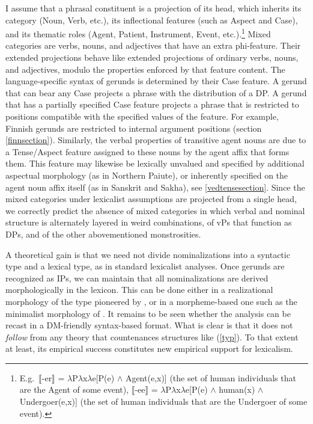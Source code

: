 \documentclass[output=paper,
modfonts
]{LSP/langsci}
\newcommand{\rf}[1]{(\ref{#1})}
\begin{document}
I assume that a phrasal constituent is a projection of its head, which inherits its category
(Noun, Verb, etc.), its inflectional features (such as Aspect and Case), and its thematic roles
(Agent, Patient, Instrument, Event, etc.).\footnote{E.g.\ ⟦-er⟧ =
  {$\lambda$}P{$\lambda$}x{$\lambda$}e[P(e) $\wedge$ Agent(e,x)] (the set of human individuals
  that are the Agent of some event), ⟦-ee⟧ = {$\lambda$}P{$\lambda$}x{$\lambda$}e[P(e) $\wedge$
  human(x) $\wedge$ Undergoer(e,x)] (the set of human individuals that are the Undergoer of
  some event).}  Mixed categories are verbs, nouns, and adjectives that have an extra
phi-feature.  Their extended projections behave like extended projections of ordinary verbs,
nouns, and adjectives, modulo the properties enforced by that feature content.  The
language-specific syntax of gerunds is determined by their Case feature. A gerund that can bear
any Case projects a phrase with the distribution of a DP.  A gerund that has a partially
specified Case feature projects a phrase that is restricted to positions compatible with the
specified values of the feature.  For example, Finnish gerunds are restricted to internal
argument positions (section \ref{finnsection}).  Similarly, the verbal properties of transitive
agent nouns are due to a Tense/Aspect feature assigned to these nouns by the agent affix that
forms them.  This feature may likewise be lexically unvalued and specified by additional
aspectual morphology (as in Northern Paiute), or inherently specified on the agent noun affix
itself (as in Sanskrit and Sakha), see \ref{vedtensesection}.  Since the mixed categories under
lexicalist assumptions are projected from a single head, we correctly predict the absence of
mixed categories in which verbal and nominal structure is alternately layered in weird
combinations, of vPs that function as DPs, and of the other abovementioned monstrosities.

A theoretical gain is that we need not divide nominalizations into a syntactic type and a
lexical type, as in standard lexicalist analyses.  Once gerunds are recognized as IPs, we can
maintain that all nominalizations are derived morphologically in the lexicon.  This can be done
either in a realizational morphology of the type pioneered by \citet{anderson1992}, or in a
morpheme-based one such as the minimalist morphology of \citet{wunderlich1996}.  It remains to be seen
whether the analysis can be recast in a DM-friendly syntax-based format.  What is clear is that
it does not \textit{follow} from any theory that countenances structures like \rf{typ}.  To
that extent at least, its empirical success constitutes new empirical support for lexicalism.
\end{document}
